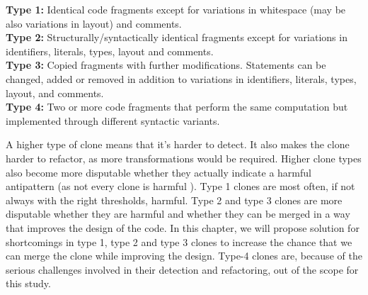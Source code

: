 \documentclass[a4paper]{article}
\begin{document}
\textbf{Type 1:} Identical code fragments except for variations in whitespace (may be also variations in layout) and comments.\\
\textbf{Type 2:} Structurally/syntactically identical fragments except for variations in identifiers, literals, types, layout and comments.\\
\textbf{Type 3:} Copied fragments with further modifications. Statements can be changed, added or removed in addition to variations in identifiers, literals, types, layout, and comments.\\
\textbf{Type 4:} Two or more code fragments that perform the same computation but implemented through different syntactic variants.

A higher type of clone means that it's harder to detect. It also makes the clone harder to refactor, as more transformations would be required. Higher clone types also become more disputable whether they actually indicate a harmful antipattern (as not every clone is harmful \cite{jarzabek2010clones, kapser2008cloning}). Type 1 clones are most often, if not always with the right thresholds, harmful. Type 2 and type 3 clones are more disputable whether they are harmful and whether they can be merged in a way that improves the design of the code. In this chapter, we will propose solution for shortcomings in type 1, type 2 and type 3 clones to increase the chance that we can merge the clone while improving the design. Type-4 clones are, because of the serious challenges involved in their detection and refactoring, out of the scope for this study.
\end{document}
